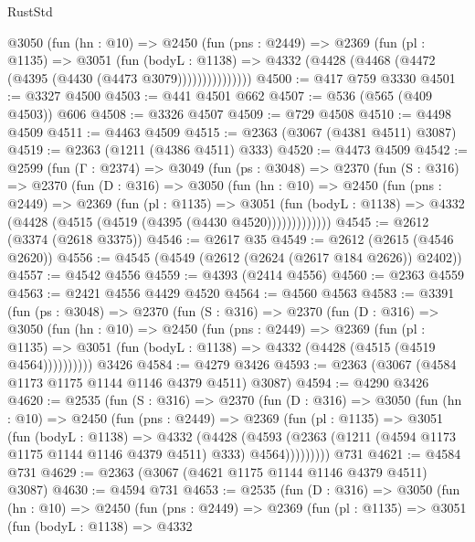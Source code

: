 \begin{lexlean}{RustStd}
\begin{coremodule}
            @3050
              (fun (hn : @10) =>
              @2450
                (fun (pns : @2449) =>
                @2369
                  (fun (pl : @1135) =>
                  @3051
                    (fun (bodyL : @1138) =>
                    @4332 (@4428 (@4468 (@4472 (@4395 (@4430 (@4473 @3079)))))))))))))))
@4500 := @417 @759 @3330
@4501 := @3327 @4500
@4503 := @441 @4501 @662
@4507 := @536 (@565 (@409 @4503)) @606
@4508 := @3326 @4507
@4509 := @729 @4508
@4510 := @4498 @4509
@4511 := @4463 @4509
@4515 := @2363 (@3067 (@4381 @4511) @3087)
@4519 := @2363 (@1211 (@4386 @4511) @333)
@4520 := @4473 @4509
@4542 := @2599
    (fun (Γ : @2374) =>
    @3049
      (fun (ps : @3048) =>
      @2370
        (fun (S : @316) =>
        @2370
          (fun (D : @316) =>
          @3050
            (fun (hn : @10) =>
            @2450
              (fun (pns : @2449) =>
              @2369
                (fun (pl : @1135) =>
                @3051
                  (fun (bodyL : @1138) =>
                  @4332 (@4428 (@4515 (@4519 (@4395 (@4430 @4520)))))))))))))
@4545 := @2612 (@3374 (@2618 @3375))
@4546 := @2617 @35
@4549 := @2612 (@2615 (@4546 @2620))
@4556 := @4545 (@4549 (@2612 (@2624 (@2617 @184 @2626)) @2402))
@4557 := @4542 @4556
@4559 := @4393 (@2414 @4556)
@4560 := @2363 @4559
@4563 := @2421 @4556 @4429 @4520
@4564 := @4560 @4563
@4583 := @3391
    (fun (ps : @3048) =>
    @2370
      (fun (S : @316) =>
      @2370
        (fun (D : @316) =>
        @3050
          (fun (hn : @10) =>
          @2450
            (fun (pns : @2449) =>
            @2369
              (fun (pl : @1135) =>
              @3051 (fun (bodyL : @1138) => @4332 (@4428 (@4515 (@4519 @4564))))))))))
    @3426
@4584 := @4279 @3426
@4593 := @2363 (@3067 (@4584 @1173 @1175 @1144 @1146 @4379 @4511) @3087)
@4594 := @4290 @3426
@4620 := @2535
    (fun (S : @316) =>
    @2370
      (fun (D : @316) =>
      @3050
        (fun (hn : @10) =>
        @2450
          (fun (pns : @2449) =>
          @2369
            (fun (pl : @1135) =>
            @3051
              (fun (bodyL : @1138) =>
              @4332
                (@4428
                  (@4593
                    (@2363 (@1211 (@4594 @1173 @1175 @1144 @1146 @4379 @4511) @333) @4564)))))))))
    @731
@4621 := @4584 @731
@4629 := @2363 (@3067 (@4621 @1175 @1144 @1146 @4379 @4511) @3087)
@4630 := @4594 @731
@4653 := @2535
    (fun (D : @316) =>
    @3050
      (fun (hn : @10) =>
      @2450
        (fun (pns : @2449) =>
        @2369
          (fun (pl : @1135) =>
          @3051
            (fun (bodyL : @1138) =>
            @4332

\end{coremodule}
\end{lexlean}
